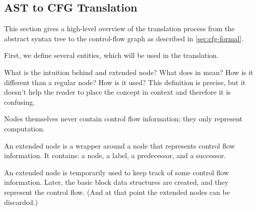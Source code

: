 \subsection{AST to CFG Translation}
\label{sec:ast_to_cfg_translation}

This section gives a high-level overview of the translation process from the
abstract syntax tree to the control-flow graph as described in \autoref{sec:cfg-formal}.

First, we define several entities, which will be used in the translation.

\begin{workinprogress}
What is the intuition behind and extended node?  What does in mean?  How is
it different than a regular node?  How is it used?  This definition is
precise, but it doesn't help the reader to place the concept in context and
therefore it is confusing.
\end{workinprogress}

\begin{workinprogress}
Nodes themselves never contain control flow information; they only
represent computation.

An extended node is a wrapper around a node that represents control flow
information.  It contains:  a node, a label, a predecessor, and a
successor.

An extended node is temporarily used to keep track of some control flow
information.  Later, the basic block data structures are created, and they
represent the control flow.  (And at that point the extended nodes can be
discarded.)
\end{workinprogress}

